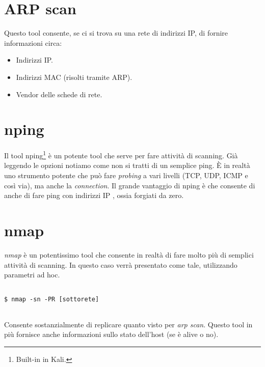 \documentclass[14pt]{extreport}
\begin{document}
\section{ARP scan}
Questo tool consente, se ci si trova su una rete di indirizzi IP, di fornire informazioni circa:

\begin{itemize}
    \item Indirizzi IP.
    \item Indirizzi MAC (risolti tramite ARP).
    \item Vendor delle schede di rete.
\end{itemize}


\section{nping}
Il tool nping\footnote{Built-in in Kali.} è un potente tool che serve per fare attività di scanning. Già leggendo le opzioni notiamo come non si tratti di un semplice ping. È in realtà uno strumento potente che può fare \textit{probing} a vari livelli (TCP, UDP, ICMP e così via), ma anche la \textit{connection}.
Il grande vantaggio di nping è che consente di anche di fare ping con indirizzi IP , ossia forgiati da zero.


\section{nmap}
\textit{nmap} è un potentissimo tool che consente in realtà di fare molto più di semplici attività di scanning. In questo caso verrà presentato come tale, utilizzando parametri ad hoc.

\vspace{5pt}

{
\small
\begin{tcolorbox}

\begin{verbatim}

$ nmap -sn -PR [sottorete]
  
\end{verbatim}

\end{tcolorbox}
}

\vspace{5pt}

Consente sostanzialmente di replicare quanto visto per \textit{arp scan}.
Questo tool in più fornisce anche informazioni sullo stato dell'host (se è alive o no).
\end{document}
